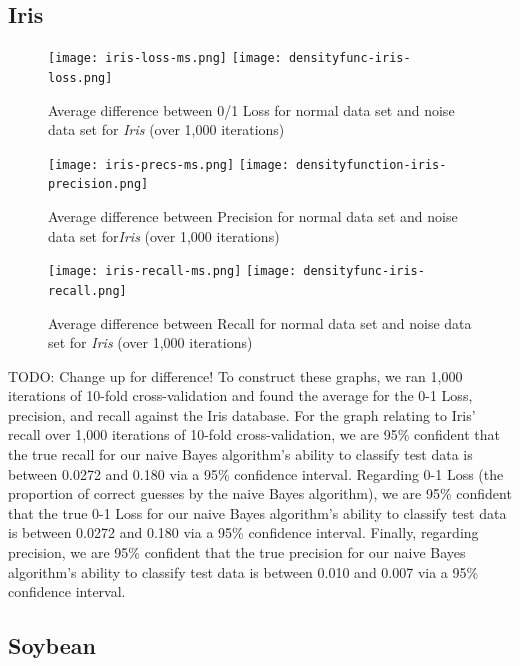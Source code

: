 \documentclass[twoside,11pt]{article}
\begin{document}
\subsection{Iris}
\begin{figure}[!hbp] %
    \centering
    \begin{minipage}[b]{0.3\textwidth}
        \texttt{[image: iris-loss-ms.png]}
        \texttt{[image: densityfunc-iris-loss.png]}
        \caption{Average difference between 0/1 Loss for normal data set and noise data set for \emph{Iris} (over 1,000 iterations)}
    \end{minipage}
    \hfill
    \begin{minipage}[b]{0.3\textwidth}
        \texttt{[image: iris-precs-ms.png]}
        \texttt{[image: densityfunction-iris-precision.png]}
        \caption{Average difference between Precision for normal data set and noise data set for\emph{Iris} (over 1,000 iterations)}
    \end{minipage}
    \hfill
    \begin{minipage}[b]{0.3\textwidth}
        \texttt{[image: iris-recall-ms.png]}
        \texttt{[image: densityfunc-iris-recall.png]}
        \caption{Average difference between Recall for normal data set and noise data set for \emph{Iris} (over 1,000 iterations)}
    \end{minipage}
\end{figure}
TODO: Change up for difference!
To construct these graphs, we ran 1,000 iterations of 10-fold cross-validation and found the average for the 0-1 Loss, precision, and recall against the Iris database. For the graph relating to Iris' recall over 1,000 iterations of 10-fold cross-validation, we are 95\% confident that the true recall for our naive Bayes algorithm's ability to classify test data is between 0.0272 and 0.180 via a 95\% confidence interval. Regarding 0-1 Loss (the proportion of correct guesses by the naive Bayes algorithm), we are 95\% confident that the true 0-1 Loss for our naive Bayes algorithm's ability to classify test data is between 0.0272 and 0.180 via a 95\% confidence interval. Finally, regarding precision, we are 95\% confident that the true precision for our naive Bayes algorithm's ability to classify test data is between 0.010 and 0.007 via a 95\% confidence interval.

\subsection{Soybean}
\end{document}
